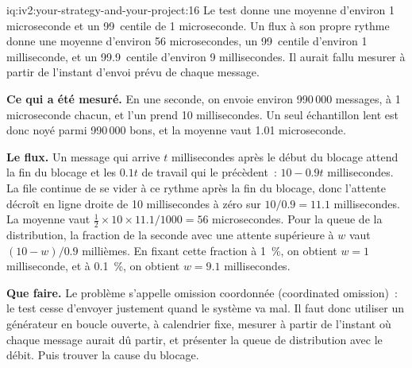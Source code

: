 \begin{solution}{iq:iv2:your-strategy-and-your-project:16}
Le test donne une moyenne d'environ 1 microseconde et un 99~centile de 1 microseconde. Un flux à son propre rythme donne une moyenne d'environ 56 microsecondes, un 99~centile d'environ 1 milliseconde, et un 99.9~centile d'environ 9 millisecondes. Il aurait fallu mesurer à partir de l'instant d'envoi prévu de chaque message.

\textbf{Ce qui a été mesuré.} En une seconde, on envoie environ 990\,000 messages, à 1 microseconde chacun, et l'un prend 10 millisecondes. Un seul échantillon lent est donc noyé parmi 990\,000 bons, et la moyenne vaut 1.01 microseconde.

\textbf{Le flux.} Un message qui arrive $t$ millisecondes après le début du blocage attend la fin du blocage et les $0.1t$ de travail qui le précèdent~: $10 - 0.9t$ millisecondes. La file continue de se vider à ce rythme après la fin du blocage, donc l'attente décroît en ligne droite de 10 millisecondes à zéro sur $10/0.9 = 11.1$ millisecondes. La moyenne vaut $\tfrac12 \times 10 \times 11.1/1000 = 56$ microsecondes. Pour la queue de la distribution, la fraction de la seconde avec une attente supérieure à $w$ vaut $(10 - w)/0.9$ millièmes. En fixant cette fraction à 1~\%, on obtient $w = 1$ milliseconde, et à 0.1~\%, on obtient $w = 9.1$ millisecondes.

\textbf{Que faire.} Le problème s'appelle omission coordonnée (coordinated omission)~: le test cesse d'envoyer justement quand le système va mal. Il faut donc utiliser un générateur en boucle ouverte, à calendrier fixe, mesurer à partir de l'instant où chaque message aurait dû partir, et présenter la queue de distribution avec le débit. Puis trouver la cause du blocage.

\end{solution}

